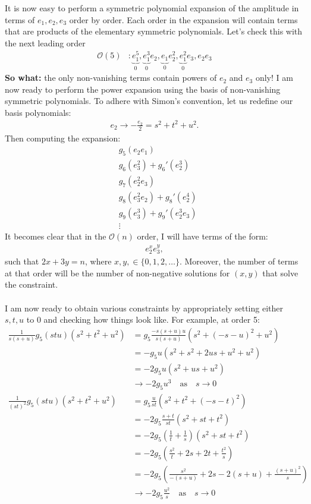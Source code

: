 \documentclass[11pt,a4paper]{article}
\begin{document}
It is now easy to perform a symmetric polynomial expansion of the amplitude in terms of $e_1, e_2, e_3$ order by order.  Each order in the expansion will contain terms that are products of the elementary symmetric polynomials.  Let's check this with the next leading order
\begin{align*}
\mathcal{O}(5) &: \underbrace{e_1^5}_{0}, \underbrace{e_1^3}_{0} e_2, \underbrace{e_1}_{0} e_2 ^2 , \underbrace{e_1^2}_{0}e_3 , e_2 e_3
\end{align*}
\textbf{So what:} the only non-vanishing terms contain powers of $e_2$ and $e_3$ only!  I am now ready to perform the power expansion using the basis of non-vanishing symmetric polynomials.  To adhere with Simon's convention, let us redefine our basis polynomials:
\begin{align*}
	e_2 \rightarrow - \frac{e_2}{2} = s^2 + t^2 + u^2.
\end{align*}
Then computing the expansion:
\begin{align*}
	& g_5 (e_2 e_1)\\
	& g_6 (e_3 ^2) + g_6 '(e_2 ^3)\\
	& g_7 (e_2^2 e_3)\\
	& g_8 (e_3^2 e_2) + g_8 '(e_2 ^4)\\
	& g_9 (e_3^3) + g_9 ' (e_2 ^3 e_3)\\
	&\vdots
\end{align*}
It becomes clear that in the $\mathcal{O}(n)$ order, I will have terms of the form:
\begin{align*}
e_2 ^x e_3 ^y,
\end{align*}
such that $2x + 3y = n$, where $x,y, \in \{0,1,2,\dots\}$.  Moreover, the number of terms at that order will be the number of non-negative solutions for $(x,y)$ that solve the constraint.  
\\
\\
I am now ready to obtain various constraints by appropriately setting either $s,t,u$ to $0$ and checking how things look like.  For example, at order 5:
\begin{align*}
	\frac{1}{s(s+u)}g_5 (stu) (s^2 + t^2 + u^2)& = g_5 \frac{-s(s+u)u}{s (s+u)} (s^2 + (-s-u)^2 + u^2)\\
	& = -g_5 u (s^2 + s^2 + 2us + u^2 + u^2)\\
	& = -2 g_5 u (s^2 + us + u^2)\\
	& \rightarrow -2g_5 u^3 \quad \text{as} \quad s\rightarrow 0\\
	\frac{1}{(st)^2}g_5 (stu) (s^2 + t^2 + u^2)& = g_5 \frac{u}{st}\left(s^2 + t^2 + (-s-t)^2\right)\\
	& =-  2g_5 \frac{s+t}{st}\left(s^2 + st + t^2\right)\\
	& = -2g_5 \left(\frac{1}{t} + \frac{1}{s}\right)\left(s^2 + st + t^2\right)\\
	& = -2g_5 \left(\frac{s^2}{t} + 2s + 2t + \frac{t^2}{s}\right)\\
	& = -2g_5 \left( \frac{s^2}{-(s+u)} + 2s - 2(s+u) + \frac{(s+u)^2}{s}\right)\\
	& \rightarrow -2g_5 \frac{u^2}{s} \quad \text{as} \quad s\rightarrow 0
\end{align*}
\end{document}
